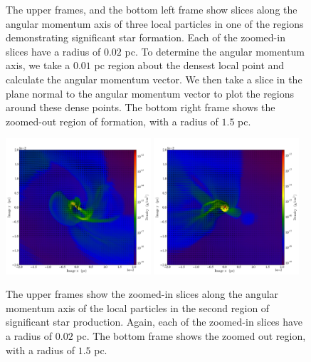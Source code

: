 \documentclass{emulateapj}
\begin{document}
\begin{figure}
\caption{The upper frames, and the bottom left frame show slices along the angular momentum axis of three local particles in one of the regions demonstrating significant star formation.  Each of the zoomed-in slices have a radius of $0.02$ pc.  To determine the angular momentum axis, we take a $0.01$ pc region about the densest local point and calculate the angular momentum vector.  We then take a slice in the plane normal to the angular momentum vector to plot the regions around these dense points.  The bottom right frame shows the zoomed-out region of formation, with a radius of $1.5$ pc.    \label{fig:snapshots}}
\end{figure}

\begin{figure}
\includegraphics[width=0.48\textwidth]{movie_disk_0132_0002.png}
\includegraphics[width=0.48\textwidth]{movie_disk_0132_0004.png}
\caption{The upper frames show the zoomed-in slices along the angular momentum axis of the local particles in the second region of significant star production.  Again, each of the zoomed-in slices have a radius of $0.02$ pc.  The bottom frame shows the zoomed out region, with a radius of $1.5$ pc.  \label{fig:snapshots 2}}
\end{figure}
\end{document}
